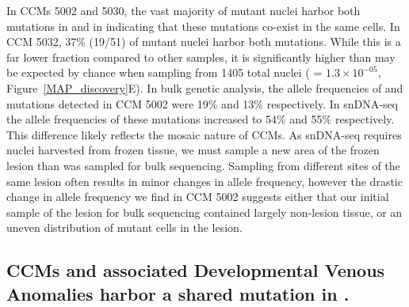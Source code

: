 In CCMs 5002 and 5030, the vast majority of mutant nuclei harbor both mutations in  and in  indicating that these mutations co-exist in the same cells. In CCM 5032, 37\% (19/51) of mutant nuclei harbor both mutations. While this is a far lower fraction compared to other samples, it is significantly higher than may be expected by chance when sampling from 1405 total nuclei ( = $1.3\times10^{-05}$, Figure~\ref{MAP_discovery}E). In bulk genetic analysis, the allele frequencies of  and  mutations detected in CCM 5002 were 19\% and 13\% respectively. In snDNA-seq the allele frequencies of these mutations increased to 54\% and 55\% respectively. This difference likely reflects the mosaic nature of CCMs. As snDNA-seq requires nuclei harvested from frozen tissue, we must sample a new area of the frozen lesion than was sampled for bulk sequencing. Sampling from different sites of the same lesion often results in minor changes in allele frequency, however the drastic change in allele frequency we find in CCM 5002 suggests either that our initial sample of the lesion for bulk sequencing contained largely non-lesion tissue, or an uneven distribution of mutant cells in the lesion. 

\subsection{CCMs and associated Developmental Venous Anomalies harbor a shared mutation in . }

